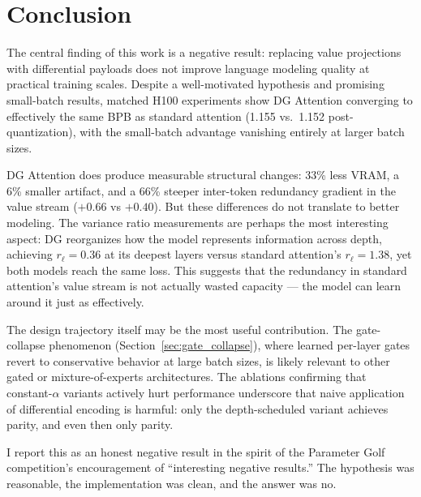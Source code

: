 \documentclass[11pt]{article}
\begin{document}
\section{Conclusion}
\label{sec:conclusion}

The central finding of this work is a negative result: replacing value projections with differential payloads does not improve language modeling quality at practical training scales. Despite a well-motivated hypothesis and promising small-batch results, matched H100 experiments show DG Attention converging to effectively the same BPB as standard attention (1.155 vs.\ 1.152 post-quantization), with the small-batch advantage vanishing entirely at larger batch sizes.

DG Attention does produce measurable structural changes: 33\% less VRAM, a 6\% smaller artifact, and a 66\% steeper inter-token redundancy gradient in the value stream ($+0.66$ vs $+0.40$). But these differences do not translate to better modeling. The variance ratio measurements are perhaps the most interesting aspect: DG reorganizes how the model represents information across depth, achieving $r_\ell = 0.36$ at its deepest layers versus standard attention's $r_\ell = 1.38$, yet both models reach the same loss. This suggests that the redundancy in standard attention's value stream is not actually wasted capacity --- the model can learn around it just as effectively.

The design trajectory itself may be the most useful contribution. The gate-collapse phenomenon (Section~\ref{sec:gate_collapse}), where learned per-layer gates revert to conservative behavior at large batch sizes, is likely relevant to other gated or mixture-of-experts architectures. The ablations confirming that constant-$\alpha$ variants actively hurt performance underscore that naive application of differential encoding is harmful: only the depth-scheduled variant achieves parity, and even then only parity.

I report this as an honest negative result in the spirit of the Parameter Golf competition's encouragement of ``interesting negative results.'' The hypothesis was reasonable, the implementation was clean, and the answer was no.
\end{document}
